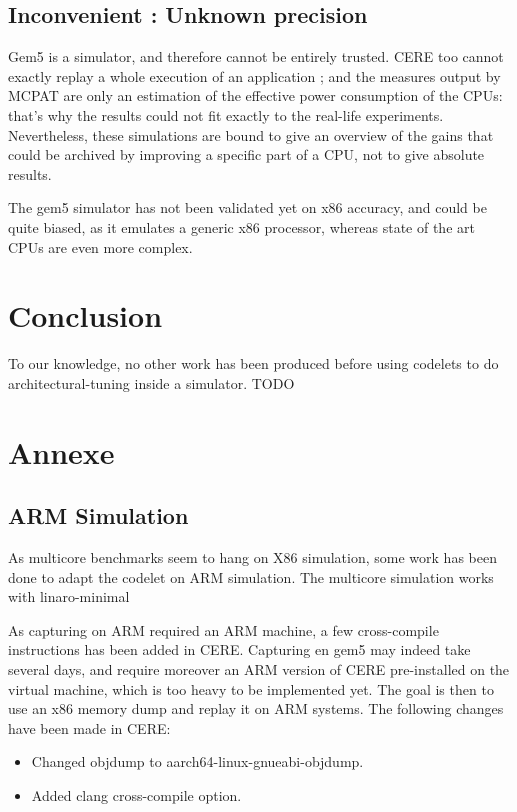 \documentclass{article}
\begin{document}
\begin{multicols}{2}
\subsection{Inconvenient : Unknown precision}
Gem5 is a simulator, and therefore cannot be entirely trusted. CERE too cannot exactly replay a whole execution of an application ; and the measures output by MCPAT are only an estimation of the effective power consumption of the CPUs: that's why the results could not fit exactly to the real-life experiments. Nevertheless, these simulations are bound to give an overview of the gains that could be archived by improving a specific part of a CPU, not to give absolute results.

The gem5 simulator has not been validated yet on x86 accuracy, and could be quite biased, as it emulates a generic x86 processor, whereas state of the art CPUs are even more complex.


\section{Conclusion}
\label{ccl}
To our knowledge, no other work has been produced before using codelets to do architectural-tuning inside a simulator.
TODO

\newpage





\newpage
\section{Annexe}
\subsection{ARM Simulation}
\label{ARM_sim}
As multicore benchmarks seem to hang on X86 simulation, some work has been done to adapt the codelet on ARM simulation.
The multicore simulation works with linaro-minimal

As capturing on ARM required an ARM machine, a few cross-compile instructions has been added in CERE. Capturing en gem5 may indeed take several days, and require moreover an ARM version of CERE pre-installed on the virtual machine, which is too heavy to be implemented yet. The goal is then to use an x86 memory dump and replay it on ARM systems. The following changes have been made in CERE:
\begin{itemize}
\item Changed objdump to aarch64-linux-gnueabi-objdump.
\item Added clang cross-compile option.
\end{itemize}


\end{multicols}
\end{document}
